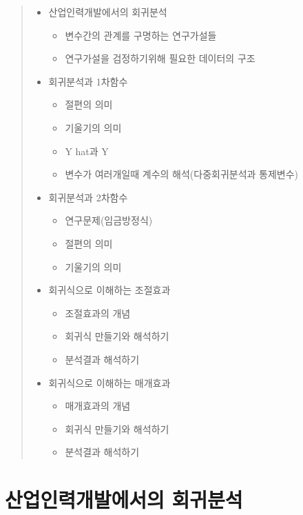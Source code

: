 \documentclass[
]{book}
\providecommand{\tightlist}{%
  \setlength{\itemsep}{0pt}\setlength{\parskip}{0pt}}
\begin{document}
\begin{quote}
\begin{itemize}
\tightlist
\item
  산업인력개발에서의 회귀분석

  \begin{itemize}
  \tightlist
  \item
    변수간의 관계를 구명하는 연구가설들
  \item
    연구가설을 검정하기위해 필요한 데이터의 구조
  \end{itemize}
\item
  회귀분석과 1차함수

  \begin{itemize}
  \tightlist
  \item
    절편의 의미
  \item
    기울기의 의미
  \item
    Y hat과 Y
  \item
    변수가 여러개일때 계수의 해석(다중회귀분석과 통제변수)
  \end{itemize}
\item
  회귀분석과 2차함수

  \begin{itemize}
  \tightlist
  \item
    연구문제(임금방정식)
  \item
    절편의 의미
  \item
    기울기의 의미
  \end{itemize}
\item
  회귀식으로 이해하는 조절효과

  \begin{itemize}
  \tightlist
  \item
    조절효과의 개념
  \item
    회귀식 만들기와 해석하기
  \item
    분석결과 해석하기
  \end{itemize}
\item
  회귀식으로 이해하는 매개효과

  \begin{itemize}
  \tightlist
  \item
    매개효과의 개념
  \item
    회귀식 만들기와 해석하기
  \item
    분석결과 해석하기
  \end{itemize}
\end{itemize}
\end{quote}

\section{산업인력개발에서의 회귀분석}\label{uxc0b0uxc5c5uxc778uxb825uxac1cuxbc1cuxc5d0uxc11cuxc758-uxd68cuxadc0uxbd84uxc11d}
\end{document}

